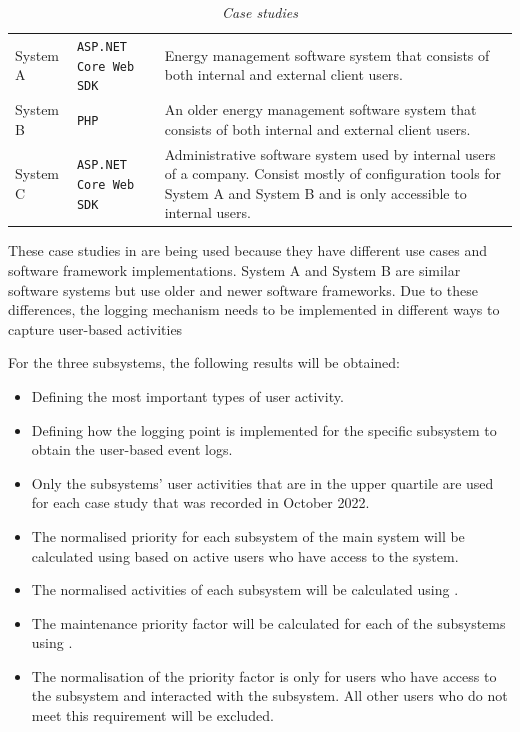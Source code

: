 \begin{table}[!htb]
	\centering
	\caption[Case studies]
	{\textit{Case studies}}
	\label{tbl:ch3_caseStudies}
	\begin{tabularx}{\textwidth}{llX}
		\toprule
		\thead{Case study} & \thead{Software framework} & \thead{Description} \\
		\midrule
		\rowcolor{lightgray}
		System A & \texttt{ASP.NET Core Web SDK} & \RaggedRight Energy management software system that consists of both internal and external client users. \\
		System B & \texttt{PHP} & \RaggedRight An older energy management software system that consists of both internal and external client users. \\
		\rowcolor{lightgray}
		System C & \texttt{ASP.NET Core Web SDK} & \RaggedRight Administrative software system used by internal users of a company. Consist mostly of configuration tools for System A and System B and is only accessible to internal users. \\
		\bottomrule
	\end{tabularx}
\end{table}

These case studies in  are being used because they have different use cases and software framework implementations. System A and System B are similar software systems but use older and newer software frameworks. Due to these differences, the logging mechanism needs to be implemented in different ways to capture user-based activities\par For the three subsystems, the following results will be obtained:

\begin{itemize}
\item Defining the most important types of user activity.
\item Defining how the logging point is implemented for the specific subsystem to obtain the user-based event logs.
\item Only the subsystems' user activities that are in the upper quartile are used for each case study that was recorded in October 2022.
\item The normalised priority for each subsystem of the main system will be calculated using  based on active users who have access to the system.
\item The normalised activities of each subsystem will be calculated using .
\item The maintenance priority factor will be calculated for each of the subsystems using .
\item The normalisation of the priority factor is only for users who have access to the subsystem and interacted with the subsystem. All other users who do not meet this requirement will be excluded.
\end{itemize}

